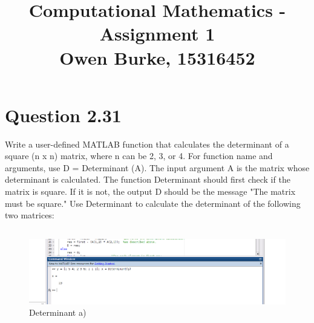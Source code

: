\documentclass{report}
\title{\textbf{Computational Mathematics - Assignment 1}\\Owen Burke, 15316452}
\begin{document}







    \maketitle
    \section*{\hfil Question 2.31 \hfil}
    Write a user-defined MATLAB function that calculates the determinant of a square (n x n) matrix, where n can be 2, 3, or 4. For function name and arguments, use D =  Determinant (A). 
    The input argu­ment A is the matrix whose determinant is calculated. The function Determinant should first check if the matrix is square. If it is not, the output D should be the
    message "The matrix must be square." Use Determinant to calculate the determinant of the following two matrices: 
        \subsection*{}
            \begin{figure}[h!]
                        \includegraphics[width=\linewidth]{Determinant_a).png}
                        \caption{Determinant a)}
                        \label{fig:Determinant a)}
            \end{figure}
\end{document}
